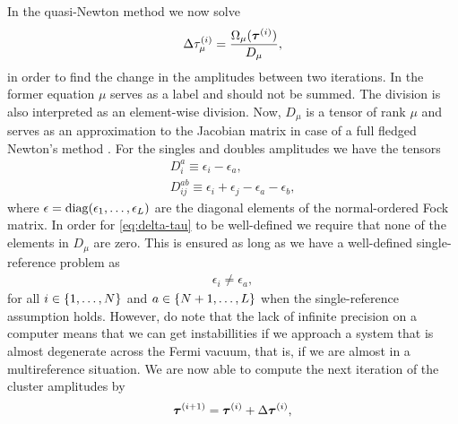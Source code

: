             In the quasi-Newton method we now solve \cite{bartlett-purvis,
            helgaker-molecular}
            \begin{align}
                \Delta \tau^{(i)}_{\mu}
                = \frac{\Omega_{\mu}(\boldsymbol{\tau}^{(i)})}{
                    D_{\mu}
                },
                \label{eq:delta-tau}
            \end{align}
            in order to find the change in the amplitudes between two
            iterations.
            In the former equation $\mu$ serves as a label and should not be
            summed.
            The division is also interpreted as an element-wise division.
            Now, $D_{\mu}$ is a tensor of rank $\mu$ and serves as an
            approximation to the Jacobian matrix in case of a full fledged
            Newton's method \cite{helgaker-molecular}.
            For the singles and doubles amplitudes we have the tensors
            \begin{gather}
                D^{a}_{i} \equiv \epsilon_i - \epsilon_a, \\
                D^{ab}_{ij} \equiv \epsilon_i + \epsilon_j
                - \epsilon_a - \epsilon_b,
            \end{gather}
            where $\epsilon = \operatorname{diag}(\epsilon_1, \dots, \epsilon_L)$ are the
            diagonal elements of the normal-ordered Fock matrix.
            In order for \autoref{eq:delta-tau} to be well-defined we require
            that none of the elements in $D_{\mu}$ are zero.
            This is ensured as long as we have a well-defined single-reference
            problem as \cite{cramer2004computational}
            \begin{align}
                \epsilon_i \neq \epsilon_a,
            \end{align}
            for all $i \in \left\{ 1, \dots, N \right\}$ and $a \in \left\{ N + 1, \dots,
            L \right\}$ when the single-reference assumption holds.
            However, do note that the lack of infinite precision on a computer
            means that we can get instabillities if we approach a system that is
            almost degenerate across the Fermi vacuum, that is, if we are almost
            in a multireference situation.
            We are now able to compute the next iteration of the cluster
            amplitudes by
            \begin{align}
                \boldsymbol{\tau}^{(i + 1)}
                = \boldsymbol{\tau}^{(i)}
                + \Delta \boldsymbol{\tau}^{(i)},
            \end{align}
